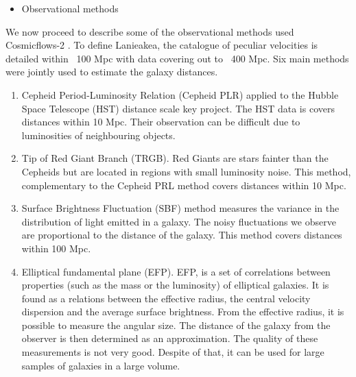 \documentclass[12pt]{article}
\begin{document}
\begin{itemize}
\item Observational methods
\end{itemize}
\begin{par}
We now proceed to describe some of the observational
 methods used Cosmicflows-2
  \cite{tully_cosmicflows-2_2013}. To define Lanieakea,
   the catalogue of
   peculiar velocities is detailed within ~100 Mpc with
    data covering out to ~400 Mpc. Six main methods
     were jointly used to estimate the galaxy
      distances.	\\
 \begin{enumerate}
 \item Cepheid Period-Luminosity
      Relation (Cepheid PLR) applied to the Hubble
       Space Telescope (HST) distance scale key
        project. The HST data is covers distances
         within 10 Mpc. Their observation can be
          difficult due to luminosities of neighbouring
           objects.\\
              
  \item Tip of Red Giant Branch (TRGB). Red Giants are
   stars 
     fainter than the Cepheids but are located in
      regions with small luminosity noise. This
       method,
       complementary to the Cepheid PRL method covers
        distances within 10 Mpc.\\
        
  \item Surface Brightness Fluctuation (SBF) method
   measures the variance in the distribution of light
    emitted in a galaxy. The noisy fluctuations we
     observe are proportional to the distance of the
      galaxy. This method covers distances within 100
       Mpc.\\
  
  \item Elliptical fundamental plane (EFP). EFP, is a
   set of correlations between properties (such as the
    mass or the luminosity) of elliptical galaxies. It
     is found as a relations between the effective
      radius, the central velocity dispersion and the
       average surface brightness. From the effective
        radius, it is possible to measure the angular
         size. The distance of the galaxy from the
          observer is then determined as an
           approximation.  
  The quality of these measurements is not very
  good. Despite of that, it can be used for large
   samples of galaxies in a large volume.\\
   

\end{enumerate}
\end{par}
\end{document}
